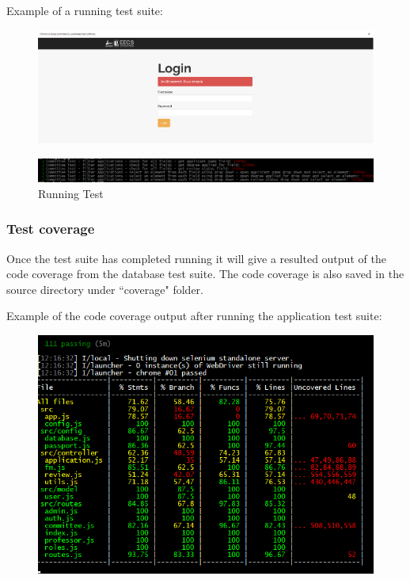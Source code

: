 \documentclass[fontsize=12pt,paper=letter,twoside]{scrartcl}
\begin{document}
\bigskip
\noindent Example of a running test suite:

\begin{figure}[!htb]
\begin{center}
\includegraphics[width=.9\textwidth]{images/application/run_test.png}
\end{center}
\label{fig:app/run_test}
\end{figure}

\begin{figure}[!htb]
\begin{center}
\includegraphics[width=.9\textwidth]{images/application/run_test2.png}
\end{center}
\caption{Running Test}
\label{fig:app/run_test2}
\end{figure}

\newpage
\subsubsection{Test coverage}
Once the test suite has completed running it will give a resulted output of the code coverage from the database test suite. The code coverage is also saved in the source directory under ``coverage" folder.

\bigskip
\noindent Example of the code coverage output after running the application test suite:

\begin{figure}[!htb]
\begin{center}
\includegraphics[width=.9\textwidth]{images/application/coverage.png}
\end{center}
\label{fig:app/coverage}
\end{figure}
\end{document}
